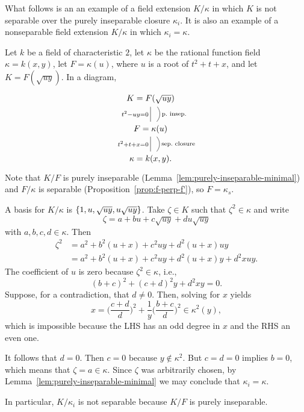 \begin{xmpl}\label{xmpl:sep-p.insep-counterexample}
    What follows is an an example of a field extension $K/\kappa$ in which $K$ is not separable over the purely inseparable closure $\kappa_i$. It is also an example of a nonseparable field extension $K/\kappa$ in which $\kappa_i=\kappa$.

    Let $k$ be a field of characteristic $2$, let $\kappa$ be the rational function field $\kappa = k(x, y)$, let $F = \kappa(u)$, where $u$ is a root of $t^2 + t + x$, and let $K = F(\sqrt{uy})$. In a diagram,
    $$
        \begin{tikzcd}%
            K=F(\sqrt{uy})\\
            F=\kappa(u)
                \arrow[u,"t^2-uy=0",no head]
                \arrow[u,no head, bend right=40,"\text{p.~insep.}"']\\
            {\kappa=k(x,y)}.
                \arrow[u,"t^2+t+x=0",no head]
                \arrow[u,no head, bend right=40,"\text{sep.~closure}"']
        \end{tikzcd}
    $$
    Note that $K/F$ is purely inseparable (Lemma~\ref{lem:purely-inseparable-minimal}) and $F/\kappa$ is separable (Proposition~\ref{prop:f-perp-f'}), so $F=\kappa_s$.

    A basis for $K/\kappa$ is $\{1, u, \sqrt{uy}, u\sqrt{uy}\}$. Take $\zeta\in K$ such that $\zeta^2\in\kappa$ and write
    $$
        \zeta = a+bu+c\sqrt{uy}+du\sqrt{uy}
    $$
    with $a,b,c,d\in\kappa$. Then
   \begin{align*}
        \zeta^2 &= a^2 + b^2(u+x) + c^2uy + d^2(u+x)uy\\
            &= a^2 + b^2(u+x) + c^2uy + d^2(u+x)y + d^2xuy.
   \end{align*}
    The coefficient of $u$ is zero because $\zeta^2\in\kappa$, i.e.,
    $$
        (b+c)^2+(c+d)^2y+d^2xy=0.
    $$
    Suppose, for a contradiction, that $d\ne0$. Then, solving for $x$ yields
    $$
        x = \Big(\frac{c+d}{d}\Big)^2 + \frac1y\Big(\frac{b+c}{d}\Big)^2 \in\kappa^2(y),
    $$
    which is impossible because the LHS has an odd degree in $x$ and the RHS an even one.

    It follows that $d=0$. Then $c=0$ because $y\notin\kappa^2$. But $c=d=0$ implies $b=0$, which means that $\zeta=a\in\kappa$. Since $\zeta$ was arbitrarily chosen, by Lemma~\ref{lem:purely-inseparable-minimal} we may conclude that $\kappa_i=\kappa$.

    In particular, $K/\kappa_i$ is not separable because $K/F$ is purely inseparable.
\end{xmpl}

